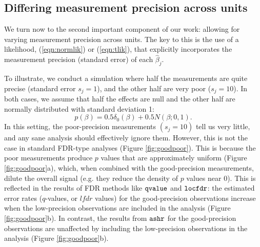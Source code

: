 \documentclass[11pt]{article}
\def\lfdr{\textit{lfdr}}
\def\bhat{\hat{\beta}}
\def\qvalue{{\tt qvalue}\xspace}
\def\locfdr{{\tt locfdr}\xspace}
\def\ashr{{\tt ashr}\xspace}
\begin{document}
\subsection*{Differing measurement precision across units}

 We turn now to the second important component of our work: allowing for varying
 measurement precision across units. The key to this is the use of a likelihood,
 (\ref{eqn:normlik}) or (\ref{eqn:tlik}), that explicitly incorporates the measurement precision (standard error) of each $\bhat_j$.
 
  To illustrate, we conduct a simulation where half the measurements are quite precise (standard error $s_j = 1$), and the other half are very poor
 ($s_j=10$).  In both cases,
we assume that half the effects are null
and the other half are normally distributed with standard deviation 1:
\begin{equation}
p(\beta) = 0.5 \delta_0(\beta) + 0.5 N(\beta; 0,1).
\end{equation}
In this setting, the poor-precision measurements $(s_j=10)$ tell us very little, and any sane analysis should effectively ignore them. 
 However, this is not the case in standard FDR-type analyses (Figure \ref{fig:goodpoor}). This is because the poor measurements 
 produce $p$ values that are approximately uniform  (Figure \ref{fig:goodpoor}a), 
 which, when combined with the good-precision measurements, dilute the overall signal (e.g. they reduce the density of $p$ values near 0).
 This is reflected in the results of FDR methods like $\qvalue$ and $\locfdr$:
the estimated error rates ($q$-values, or $\lfdr$ values) for the good-precision observations increase when the low-precision observations are included in the analysis
(Figure \ref{fig:goodpoor}b). In contrast, the results from $\ashr$ 
for the good-precision observations are unaffected by including the low-precision observations in the analysis (Figure \ref{fig:goodpoor}b).
\end{document}
